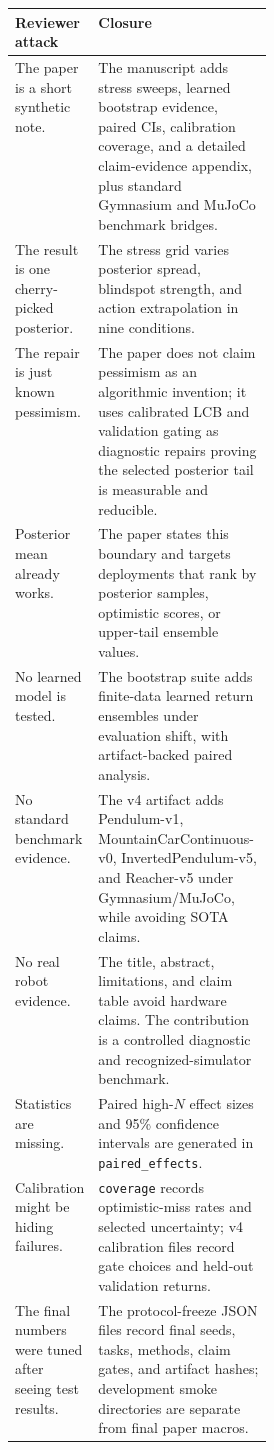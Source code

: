 \documentclass{article}
\begin{document}
\begin{center}
\small
\begin{tabularx}{\linewidth}{p{0.30\linewidth}X}
\toprule
Reviewer attack & Closure \\
\midrule
The paper is a short synthetic note. & The manuscript adds stress sweeps,
learned bootstrap evidence, paired CIs, calibration coverage, and a detailed
claim-evidence appendix, plus standard Gymnasium and MuJoCo benchmark bridges. \\
The result is one cherry-picked posterior. & The stress grid varies posterior
spread, blindspot strength, and action extrapolation in nine conditions. \\
The repair is just known pessimism. & The paper does not claim pessimism as an
algorithmic invention; it uses calibrated LCB and validation gating as
diagnostic repairs proving the selected posterior tail is measurable and
reducible. \\
Posterior mean already works. & The paper states this boundary and targets
deployments that rank by posterior samples, optimistic scores, or upper-tail
ensemble values. \\
No learned model is tested. & The bootstrap suite adds finite-data learned
return ensembles under evaluation shift, with artifact-backed paired analysis. \\
No standard benchmark evidence. & The v4 artifact adds Pendulum-v1,
MountainCarContinuous-v0, InvertedPendulum-v5, and Reacher-v5 under
Gymnasium/MuJoCo, while avoiding SOTA claims. \\
No real robot evidence. & The title, abstract, limitations, and claim table
avoid hardware claims. The contribution is a controlled diagnostic and
recognized-simulator benchmark. \\
Statistics are missing. & Paired high-$N$ effect sizes and 95\% confidence
intervals are generated in \texttt{paired\_effects}. \\
Calibration might be hiding failures. & \texttt{coverage}
records optimistic-miss rates and selected uncertainty; v4 calibration files
record gate choices and held-out validation returns. \\
The final numbers were tuned after seeing test results. & The protocol-freeze
JSON files record final seeds, tasks, methods, claim gates, and artifact hashes;
development smoke directories are separate from final paper macros. \\
\bottomrule
\end{tabularx}
\end{center}
\end{document}
